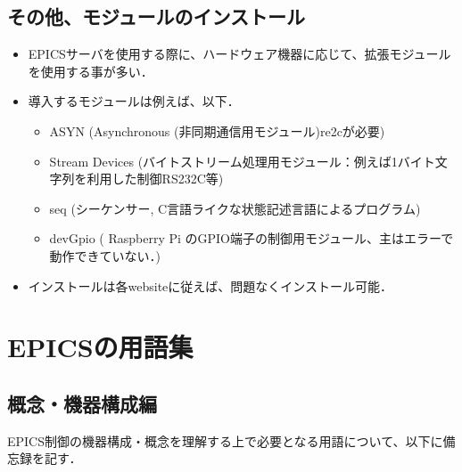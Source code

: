 \documentclass[letterpaper,10pt,dvipdfmx]{sphinxmanual}
\begin{document}
\subsection{その他、モジュールのインストール}
\label{\detokenize{epics/rst/basic_startup:id3}}\begin{itemize}
\item {} 
EPICSサーバを使用する際に、ハードウェア機器に応じて、拡張モジュールを使用する事が多い．

\item {} 
導入するモジュールは例えば、以下．
\begin{itemize}
\item {} 
ASYN (Asynchronous (非同期通信用モジュール)re2cが必要)

\item {} 
Stream Devices (バイトストリーム処理用モジュール：例えば1バイト文字列を利用した制御RS\sphinxhyphen{}232C等)

\item {} 
seq (シーケンサー, C言語ライクな状態記述言語によるプログラム)

\item {} 
devGpio ( Raspberry Pi のGPIO端子の制御用モジュール、主はエラーで動作できていない．)

\end{itemize}

\item {} 
インストールは各websiteに従えば、問題なくインストール可能．

\end{itemize}


\section{EPICSの用語集}
\label{\detokenize{epics/rst/vocabulary:epics}}\label{\detokenize{epics/rst/vocabulary::doc}}

\subsection{概念・機器構成編}
\label{\detokenize{epics/rst/vocabulary:id1}}
EPICS制御の機器構成・概念を理解する上で必要となる用語について、以下に備忘録を記す．
\end{document}
